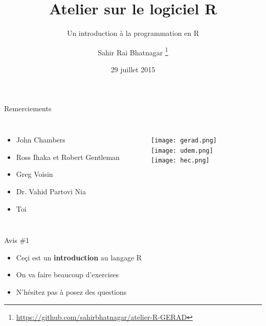 \documentclass[11pt]{beamer}\usepackage[]{graphicx}\usepackage[]{color}
\begin{document}
\title[Atelier sur le logiciel R]{Atelier sur le logiciel R}
\subtitle{Un introduction \`{a} la programmation en R}

\author[]{Sahir Rai Bhatnagar%
\thanks{\href{https://github.com/sahirbhatnagar/atelier-R-GERAD}{https://github.com/sahirbhatnagar/atelier-R-GERAD}%
}}

\date{29 juillet 2015}


\maketitle

\begin{frame}{Remerciements}
\begin{columns}[c] %


\begin{itemize}
\item John Chambers
\item Ross Ihaka et Robert Gentleman
\item Greg Voisin
\item Dr. Vahid Partovi Nia
\item Toi
\end{itemize}

\begin{figure}
\texttt{[image: gerad.png]}\\[2mm]
\texttt{[image: udem.png]}\\[5mm]
\texttt{[image: hec.png]}
\end{figure}

\end{columns}
\end{frame}


\begin{frame}{Avis \#1}
\begin{itemize}
\item Ce\c{c}i est un \textbf{introduction} au langage R
\pause \item On va faire beaucoup d'exercises
\pause \item N'h\'{e}sitez pas \`{a} posez des questions
\end{itemize}
\end{frame}
\end{document}
